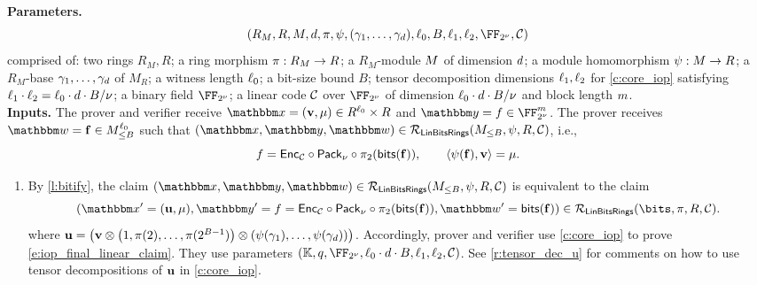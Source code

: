 \documentclass[11pt,letterpaper,usenames,dvipsnames]{article}
\begin{document}
\begin{construction}\label{c:LinModFieldBin}

 \textbf{Parameters.} $$(R_M, R, \moduleone,\moduledegree,\ringmorphism, \modulemorphism, (\gamma_1, \ldots, \gamma_\moduledegree), \codedim_0, B, \codedim_1,\codedim_2, \comfield,\cC)$$ comprised of: two rings $R_M, R$; a ring morphism $\pi:R_M \to R$; a $R_M$-module $M$ of dimension $d$;  a module homomorphism $\psi:M\to R$; a $R_M$-base $\gamma_1, \ldots, \gamma_{d}$ of $M_R$; a witness length $\ell_0$; a bit-size bound $B$; tensor decomposition dimensions $\ell_1, \ell_2$ for \cref{c:core_iop} satisfying $\ell_1\cdot \ell_2 = \ell_0 \cdot d\cdot B/\nu$; a binary field $\comfield$; a linear code $\mathcal{C}$ over $\comfield$ of dimension $\ell_0\cdot d\cdot B/\nu$ and block length $m$.\\



\noindent \textbf{Inputs.} The prover and verifier receive $\inp=(\vv, \mu)\in R^{\codedim_0}\times \moduletwo$ and  $\oracle= f \in \comfield^\codelength$. The prover receives  $\wit= \bff\in \moduleonebound^{\codedim_0}$ such that $(\inp,\oracle, \wit) \in \LinModFieldBin(\moduleonebound,\modulemorphism, \moduletwo, \cC)$, i.e., 
%
$$
f = \mathsf{Enc}_{\mathcal{C}}\circ \mathsf{Pack}_\nu\circ\pi_2(\mathsf{bits}(\mathbf{f})),\qquad \langle \psi(\mathbf{f}), \mathbf{v} \rangle = \mu.
$$
\begin{enumerate}[leftmargin=*]
     \item By \cref{l:bitify}, the   claim $(\inp,\oracle, \wit) \in \LinModFieldBin(\moduleonebound,\modulemorphism, R,  \cC)$ is equivalent to the claim \begin{equation}\label{e:iop_final_linear_claim}
    \left(\inp'=(\uu,\mu), \oracle' = f=\Enc_{\cC}\circ \pack\circ\pi_2(\mathsf{bits}(\ff)), \wit' = \mathsf{bits}(\ff)\right) \in \LinBitsDual(\bits,\ringmorphism, R,\cC).
\end{equation}
where $\mathbf{u} =   \left(\mathbf{v} \otimes \left(1, \pi(2), \ldots, \pi(2^{B-1})\right) \otimes \left(\psi(\gamma_1), \ldots, \psi(\gamma_{d})\right)\right)$. Accordingly, prover and verifier use \cref{c:core_iop} to prove \eqref{e:iop_final_linear_claim}. They use parameters $(\KK,q,\comfield,\codedim_0\cdot \moduledegree\cdot B,\codedim_1,\codedim_2,\cC)$.  See \cref{r:tensor_dec_u} for comments on how to use tensor decompositions of $\mathbf{u}$ in \cref{c:core_iop}.
\end{enumerate}
\end{construction}
\end{document}
